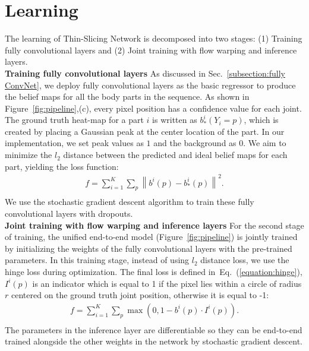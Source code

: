 \documentclass[10pt,twocolumn,letterpaper]{article}
\newcommand{\figref}[1]{Figure~\ref{#1}}
\newcommand{\secref}[1]{Sec.~\ref{#1}}
\newcommand{\refequ}[1]{Eq.~(\ref{#1})}
\begin{document}
\section{Learning}
The learning of Thin-Slicing Network is decomposed into two stages: (1) Training fully convolutional layers and (2) Joint training with flow warping and inference layers. \\

\noindent\textbf{Training fully convolutional layers}%
As discussed in \secref{subsection:fully ConvNet}, we deploy fully convolutional layers as the basic regressor to produce the belief maps for all the body parts in the sequence. As shown in \figref{fig:pipeline},(c), every pixel position has a confidence value for each joint. The ground truth heat-map for a part $i$ is written as $b_{\ast}^i(Y_i = p)$, which is created by placing a Gaussian peak at the center location of the part. In our implementation, we set peak values as $1$ and the background as $0$. We aim to minimize the $l_2$ distance between the predicted and ideal belief maps for each part, yielding the loss function:
\begin{equation}
\begin{aligned}
f = \sum_{i=1}^K\sum_{p}\left \|  b^i(p)-b_{\ast}^i(p) \right \|^2.\\
\end{aligned}
\label{equation:stage1}
\end{equation}
We use the stochastic gradient descent algorithm to train these fully convolutional layers with dropouts.\\

\noindent\textbf{Joint training with flow warping and inference layers}
For the second stage of training, the unified end-to-end model (\figref{fig:pipeline}) is jointly trained by initializing the weights of the fully convolutional layers with the pre-trained parameters. In this training stage, instead of using $l_2$ distance loss, we use the hinge loss during optimization. The final loss is defined in~\refequ{equation:hinge},
$I^i(p)$ is an indicator which is equal to 1 if the pixel lies within a circle of radius $r$ centered on the ground truth joint position, otherwise it is equal to -1:
\begin{equation}
\begin{aligned}
f = \sum_{i=1}^K\sum_{p}  \max(0,1-b^i(p)\cdot I^i(p)).\\
\end{aligned}
\label{equation:hinge}
\end{equation}
The parameters in the inference layer are differentiable so they can be end-to-end trained alongside the other weights in the  network by stochastic gradient descent.
\end{document}
